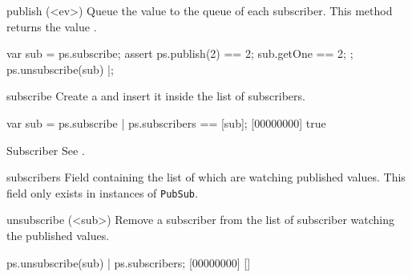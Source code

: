 \begin{urbiscriptapi}
\item[publish](<ev>)%
  Queue the value  to the queue of each subscriber.  This method
  returns the value .

\begin{urbiscript}
{
  var sub = ps.subscribe;
  assert
  {
    ps.publish(2) == 2;
    sub.getOne == 2;
  };
  ps.unsubscribe(sub)
}|;
\end{urbiscript}


\item[subscribe] Create a  and insert it inside the list
  of subscribers.

\begin{urbiscript}
var sub = ps.subscribe |
ps.subscribers == [sub];
[00000000] true
\end{urbiscript}


\item[Subscriber] See .


\item[subscribers] Field containing the list of  which
  are watching published values.  This field only exists in instances of
  \lstinline|PubSub|.


\item[unsubscribe](<sub>)%
  Remove a subscriber from the list of subscriber watching the published
  values.

\begin{urbiscript}
ps.unsubscribe(sub) |
ps.subscribers;
[00000000] []
\end{urbiscript}
\end{urbiscriptapi}

